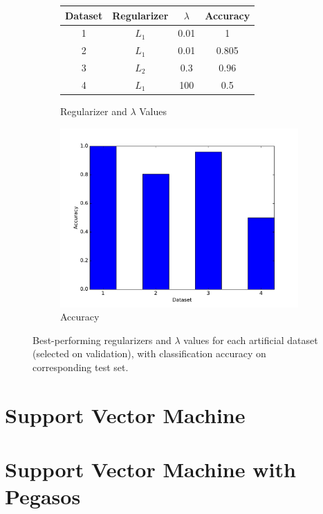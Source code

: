 \documentclass[10pt,psamsfonts]{amsart}
\theoremstyle{definition}
\theoremstyle{remark}
\numberwithin{equation}{section}
\begin{document}
\begin{figure}
	\centering
	\begin{subfigure}[b]{0.4\textwidth}
		\centering
		\begin{tabular}{c|c|c|c}\hline
			Dataset & Regularizer & $\lambda$ & Accuracy\\\hline
			1 & $L_1$ & 0.01 & 1 \\
			2 & $L_1$ & 0.01 & 0.805\\
			3 & $L_2$ & 0.3& 0.96  \\
			4 & $L_1$ & 100& 0.5 \\\hline
		\end{tabular}
		\caption{Regularizer and $\lambda$ Values}
	\end{subfigure}
	\begin{subfigure}[b]{0.35\textwidth}
		\includegraphics[width=\textwidth]{hw2_1-3_1.pdf}
		\caption{Accuracy}
	\end{subfigure}
	\caption{Best-performing regularizers and $\lambda$ values for each artificial dataset (selected on validation), with classification accuracy on corresponding test set.}
\end{figure}

\section{Support Vector Machine}

\section{Support Vector Machine with Pegasos}
\end{document}
